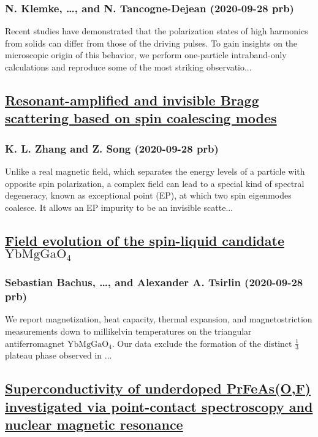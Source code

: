 \subsubsection*{N. Klemke, \dots, and N. Tancogne-Dejean (2020-09-28 prb)}
Recent studies have demonstrated that the polarization states of high harmonics from solids can differ from those of the driving pulses. To gain insights on the microscopic origin of this behavior, we perform one-particle intraband-only calculations and reproduce some of the most striking observatio...
\subsection*{\href{http://link.aps.org/doi/10.1103/PhysRevB.102.104309}{Resonant-amplified and invisible Bragg scattering based on spin coalescing modes}}
\subsubsection*{K. L. Zhang and Z. Song (2020-09-28 prb)}
Unlike a real magnetic field, which separates the energy levels of a particle with opposite spin polarization, a complex field can lead to a special kind of spectral degeneracy, known as exceptional point (EP), at which two spin eigenmodes coalesce. It allows an EP impurity to be an invisible scatte...
\subsection*{\href{http://link.aps.org/doi/10.1103/PhysRevB.102.104433}{Field evolution of the spin-liquid candidate $\mathrm{Yb}\mathrm{Mg}\mathrm{Ga}{\mathrm{O}}_{4}$}}
\subsubsection*{Sebastian Bachus, \dots, and Alexander A. Tsirlin (2020-09-28 prb)}
We report magnetization, heat capacity, thermal expansion, and magnetostriction measurements down to millikelvin temperatures on the triangular antiferromagnet $\mathrm{Yb}\mathrm{Mg}\mathrm{Ga}{\mathrm{O}}_{4}$. Our data exclude the formation of the distinct $\frac{1}{3}$ plateau phase observed in ...
\subsection*{\href{http://link.aps.org/doi/10.1103/PhysRevB.102.104513}{Superconductivity of underdoped PrFeAs(O,F) investigated via point-contact spectroscopy and nuclear magnetic resonance}}
